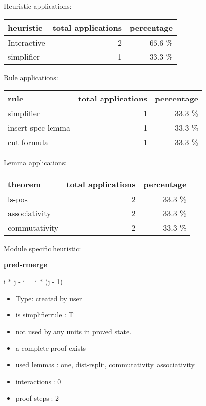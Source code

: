 \documentclass[a4paper]{article}
\begin{document}
\medskip


Heuristic applications:

\begin{supertabular}{l|r|r}
heuristic	& total applications & percentage \\ \hline
Interactive & 2 & 66.6 \% \\
simplifier & 1 & 33.3 \% \\

\end{supertabular}

Rule applications:

\begin{supertabular}{l|r|r}
rule	        & total applications & percentage \\ \hline
simplifier & 1 & 33.3 \% \\
insert spec-lemma & 1 & 33.3 \% \\
cut formula & 1 & 33.3 \% \\

\end{supertabular}

Lemma applications:

\begin{supertabular}{l|r|r}
theorem	        & total applications & percentage \\ \hline
ls-pos & 2 & 33.3 \% \\
associativity & 2 & 33.3 \% \\
commutativity & 2 & 33.3 \% \\

\end{supertabular}

Module specific heuristic:

\pagebreak

{\LARGE\bf pred-rmerge}\label{lemma-pred-rmerge}

\medskip

 \Fol i $*$ j - i = i $*$ (j - 1)

\begin{itemize}

\item Type: created by user

\item is simplifierrule : T
\item not used by any units in proved state.
\item       a complete proof exists
\item       used lemmas  : one, dist-rsplit, commutativity, associativity
\item       interactions : 0
\item       proof steps  : 2
\end{itemize}
\end{document}
